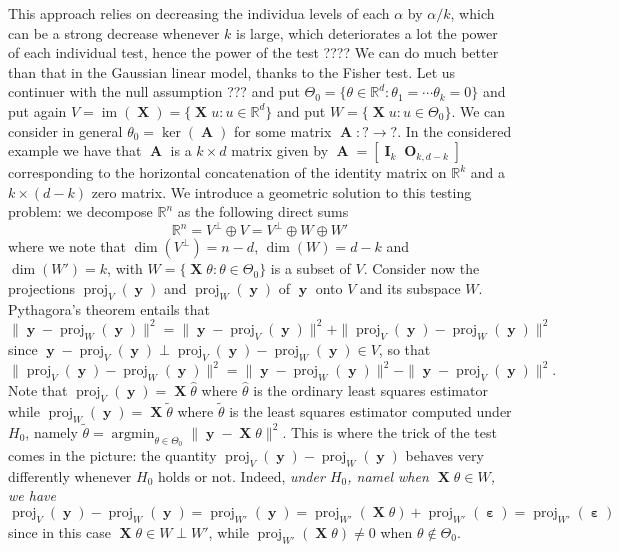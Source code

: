 \documentclass[
	fontsize=11pt, %
	twoside=false, %
	numbers=noenddot, %
]{kaobook}
\DeclareMathOperator{\bA}{{\boldsymbol A}}
\DeclareMathOperator{\bI}{{\boldsymbol I}}
\DeclareMathOperator{\bO}{{\boldsymbol O}}
\DeclareMathOperator{\bX}{{\boldsymbol X}}
\DeclareMathOperator{\by}{{\boldsymbol y}}
\DeclareMathOperator{\beps}{\boldsymbol \varepsilon}
\DeclareMathOperator{\im}{im}
\DeclareMathOperator*{\argmin}{argmin}
\DeclareMathOperator{\proj}{proj}
\newcommand{\R}{\mathbb R}
\newcommand{\wh}{\widehat}
\newcommand{\norm}[1]{\|#1\|}
\begin{document}
This approach relies on decreasing the individua levels of each $\alpha$ by $\alpha / k$, which can be a strong decrease whenever $k$ is large, which deteriorates a lot the power of each individual test, hence the power of the test ????
We can do much better than that in the Gaussian linear model, thanks to the Fisher test.
Let us continuer with the null assumption ??? and put $\Theta_0 = \{ \theta \in \R^d : \theta_1 = \cdots \theta_k = 0 \}$ and put again $V = \im(\bX) = \{ \bX u : u \in \R^d\}$ and put $W = \{ \bX u : u \in \Theta_0 \}$. We can consider in general $\theta_0 = \ker(\bA)$ for some matrix $\bA : ? \rightarrow ?$. In the considered example we have that $\bA$ is a $k \times d$ matrix given by 
$\bA = [\bI_k \bO_{k, d-k}]$ corresponding to the horizontal concatenation of the identity matrix on $\R^k$ and a $k \times (d-k)$ zero matrix.
We introduce a geometric solution to this testing problem: we decompose $\R^n$ as the following direct sums
\begin{equation*}
	\R^n = V^\perp \oplus V = V^\perp \oplus W \oplus W'
\end{equation*}
where we note that $\dim(V^\perp) = n - d$, $\dim(W) = d - k$ and $\dim(W') = k$, with $W = \{ \bX \theta : \theta \in \Theta_0 \}$ is a subset of $V$.
Consider now the projections $\proj_V(\by)$ and $\proj_W(\by)$ of $\by$ onto $V$ and its subspace $W$.
Pythagora's theorem entails that $\norm{\by - \proj_W(\by)}^2 = \norm{\by - \proj_V(\by)}^2 + \norm{\proj_V(\by) - \proj_W(\by)}^2$ since $\by - \proj_V(\by) \perp \proj_V(\by) - \proj_W(\by) \in V$, so that 
\begin{equation*}
	\norm{\proj_V(\by) - \proj_W(\by)}^2 = \norm{\by - \proj_W(\by)}^2 - \norm{\by - \proj_V(\by)}^2.
\end{equation*}
Note that $\proj_V(\by) = \bX \wh \theta$ where $\wh \theta$ is the ordinary least squares estimator while $\proj_W(\by) = \bX \tilde \theta$ where $\tilde \theta$ is the least squares estimator computed under $H_0$, namely $\tilde \theta = \argmin_{\theta \in \Theta_0} \norm{\by - \bX \theta}^2$.
This is where the trick of the test comes in the picture: the quantity $\proj_V(\by) - \proj_W(\by)$ behaves very differently whenever $H_0$ holds or not. Indeed, \emph{under $H_0$, namel when $\bX \theta \in W$, we have}
\begin{equation*}
	\proj_V(\by) - \proj_W(\by) = \proj_{W'} (\by) = \proj_{W'}(\bX \theta) + \proj_{W'}(\beps) = \proj_{W'}(\beps)
\end{equation*}
since in this case $\bX \theta \in W \perp W'$, while $\proj_{W'}(\bX \theta) \neq 0$ when $\theta \notin \Theta_0$.
\end{document}
